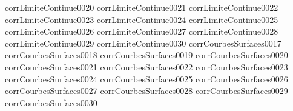 {corrLimiteContinue0020}
{corrLimiteContinue0021}
{corrLimiteContinue0022}
{corrLimiteContinue0023}
{corrLimiteContinue0024}
{corrLimiteContinue0025}
{corrLimiteContinue0026}
{corrLimiteContinue0027}
{corrLimiteContinue0028}
{corrLimiteContinue0029}
{corrLimiteContinue0030}
{corrCourbesSurfaces0017}
{corrCourbesSurfaces0018}
{corrCourbesSurfaces0019}
{corrCourbesSurfaces0020}
{corrCourbesSurfaces0021}
{corrCourbesSurfaces0022}
{corrCourbesSurfaces0023}
{corrCourbesSurfaces0024}
{corrCourbesSurfaces0025}
{corrCourbesSurfaces0026}
{corrCourbesSurfaces0027}
{corrCourbesSurfaces0028}
{corrCourbesSurfaces0029}
{corrCourbesSurfaces0030}
